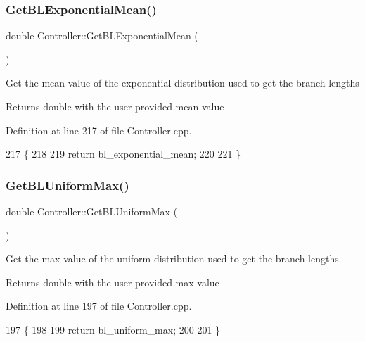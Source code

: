 \subsubsection{\texorpdfstring{Get\+B\+L\+Exponential\+Mean()}{GetBLExponentialMean()}}
{\footnotesize\ttfamily double Controller\+::\+Get\+B\+L\+Exponential\+Mean (\begin{DoxyParamCaption}{ }\end{DoxyParamCaption})}

Get the mean value of the exponential distribution used to get the branch lengths \begin{DoxyReturn}{Returns}
double with the user provided mean value 
\end{DoxyReturn}


Definition at line 217 of file Controller.\+cpp.


\begin{DoxyCode}
217                                        \{
218   
219   \textcolor{keywordflow}{return} bl\_exponential\_mean;
220 
221 \}
\end{DoxyCode}
\mbox{\label{classController_a3e8896ea85dbcf96e8995bcc15ab5945}} 
\subsubsection{\texorpdfstring{Get\+B\+L\+Uniform\+Max()}{GetBLUniformMax()}}
{\footnotesize\ttfamily double Controller\+::\+Get\+B\+L\+Uniform\+Max (\begin{DoxyParamCaption}{ }\end{DoxyParamCaption})}

Get the max value of the uniform distribution used to get the branch lengths \begin{DoxyReturn}{Returns}
double with the user provided max value 
\end{DoxyReturn}


Definition at line 197 of file Controller.\+cpp.


\begin{DoxyCode}
197                                   \{
198   
199   \textcolor{keywordflow}{return} bl\_uniform\_max;
200   
201 \}
\end{DoxyCode}
\mbox{\label{classController_a733dd443633473ab1105c7f9bb88436a}} 
